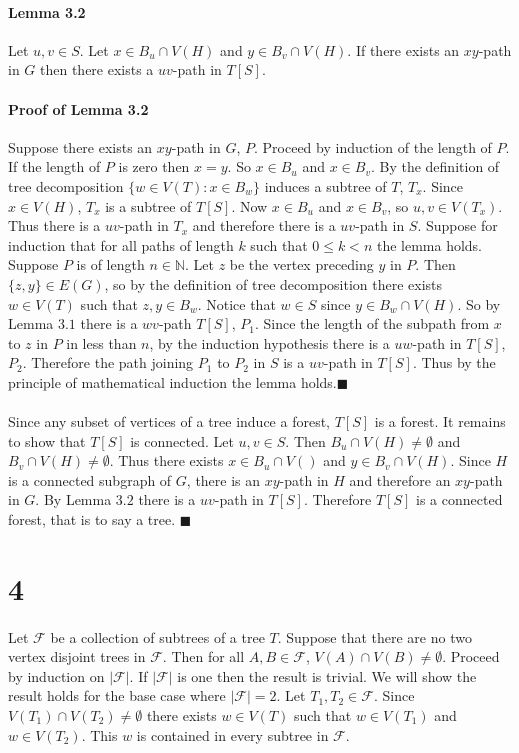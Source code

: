 \documentclass[letterpaper,12pt,oneside,onecolumn]{report}
\begin{document}
\paragraph{Lemma 3.2}
Let $u, v \in S$. Let $x \in B_u \cap V(H)$ and $y \in B_v \cap V(H)$. If there exists an $xy$-path in $G$ then there exists a $uv$-path in $T[S]$.
\paragraph{Proof of Lemma 3.2}
Suppose there exists an $xy$-path in $G$, $P$. Proceed by induction of the length of $P$. If the length of $P$ is zero then $x=y$. So $x \in B_u$ and $x \in B_v$. By the definition of tree decomposition $\{w \in V(T) : x \in B_w \}$ induces a subtree of $T$, $T_x$. Since $x \in V(H)$, $T_x$ is a subtree of $T[S]$. Now $x \in B_u$ and $x \in B_v$, so $u, v \in V(T_x)$. Thus there is a $uv$-path in $T_x$ and therefore there is a $uv$-path in $S$. Suppose for induction that for all paths of length $k$ such that $0\leq k < n$ the lemma holds. Suppose $P$ is of length $n \in \mathbb{N}$. Let $z$ be the vertex preceding $y$ in $P$. Then $\{z,y\} \in E(G)$, so by the definition of tree decomposition there exists $w \in V(T)$ such that $z,y \in B_w$. Notice that $w \in S$ since $y \in B_w \cap V(H)$. So by Lemma $3.1$ there is a $wv$-path $T[S]$, $P_1$. Since the length of the subpath from $x$ to $z$ in $P$ in less than $n$, by the induction hypothesis there is a $uw$-path in $T[S]$, $P_2$. Therefore the path joining $P_1$ to $P_2$ in $S$ is a $uv$-path in $T[S]$. Thus by the principle of mathematical induction the lemma holds.$\blacksquare$
\paragraph{}
Since any subset of vertices of a tree induce a forest, $T[S]$ is a forest. It remains to show that $T[S]$ is connected. Let $u,v \in S$. Then $B_u \cap V(H) \neq \emptyset$ and $B_v \cap V(H) \neq \emptyset$. Thus there exists $x \in B_u \cap V()$ and $y \in B_v \cap V(H)$. Since $H$ is a connected subgraph of $G$, there is an $xy$-path in $H$ and therefore an $xy$-path in $G$. By Lemma $3.2$ there is a $uv$-path in $T[S]$. Therefore $T[S]$ is a connected forest, that is to say a tree. $\blacksquare$
\section*{4}
\paragraph{}
Let $\mathcal{F}$ be a collection of subtrees of a tree $T$. Suppose that there are no two vertex disjoint trees in $\mathcal{F}$. Then for all $A, B \in \mathcal{F}$, $V(A) \cap V(B) \neq \emptyset$. Proceed by induction on $|\mathcal{F}|$. If $|\mathcal{F}|$ is one then the result is trivial. We will show the result holds for the base case where $|\mathcal{F}| = 2$. Let $T_1, T_2 \in \mathcal{F}$. Since $V(T_1) \cap V(T_2) \neq \emptyset$ there exists $w \in V(T)$ such that $w \in V(T_1)$ and $w \in V(T_2)$. This $w$ is contained in every subtree in $\mathcal{F}$.
\end{document}
